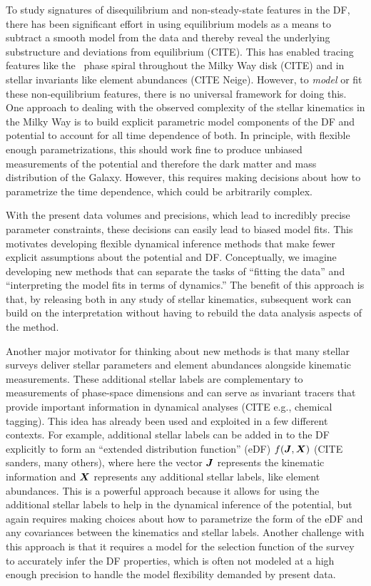 To study signatures of disequilibrium and non-steady-state features in the DF, there has
been significant effort in using equilibrium models as a means to subtract a smooth
model from the data and thereby reveal the underlying substructure and deviations from
equilibrium (CITE).
This has enabled tracing features like the \gaia\ phase spiral throughout the Milky Way
disk (CITE) and in stellar invariants like element abundances (CITE Neige).
However, to \emph{model} or fit these non-equilibrium features, there is no universal
framework for doing this.
One approach to dealing with the observed complexity of the stellar kinematics in the
Milky Way is to build explicit parametric model components of the DF and potential to
account for all time dependence of both.
In principle, with flexible enough parametrizations, this should work fine to produce
unbiased measurements of the potential and therefore the dark matter and mass
distribution of the Galaxy.
However, this requires making decisions about how to parametrize the time dependence,
which could be arbitrarily complex.

With the present data volumes and precisions, which lead to incredibly precise parameter
constraints, these decisions can easily lead to biased model fits.
This motivates developing flexible dynamical inference methods that make fewer explicit
assumptions about the potential and DF.
Conceptually, we imagine developing new methods that can separate the tasks of ``fitting
the data'' and ``interpreting the model fits in terms of dynamics.''
The benefit of this approach is that, by releasing both in any study of stellar
kinematics, subsequent work can build on the interpretation without having to rebuild
the data analysis aspects of the method.


Another major motivator for thinking about new methods is that many stellar surveys
deliver stellar parameters and element abundances alongside kinematic measurements.
These additional stellar labels are complementary to measurements of phase-space
dimensions and can serve as invariant tracers that provide important information in
dynamical analyses (CITE e.g., chemical tagging).
This idea has already been used and exploited in a few different contexts.
For example, additional stellar labels can be added in to the DF explicitly to form an
``extended distribution function'' (eDF) $f(\boldsymbol{J}, \boldsymbol{X})$ (CITE sanders, many
others), where here the vector $\boldsymbol{J}$ represents the kinematic information and
$\boldsymbol{X}$ represents any additional stellar labels, like element abundances.
This is a powerful approach because it allows for using the additional stellar labels to
help in the dynamical inference of the potential, but again requires making choices
about how to parametrize the form of the eDF and any covariances between the kinematics
and stellar labels.
Another challenge with this approach is that it requires a model for the selection
function of the survey to accurately infer the DF properties, which is often not modeled
at a high enough precision to handle the model flexibility demanded by present data.

